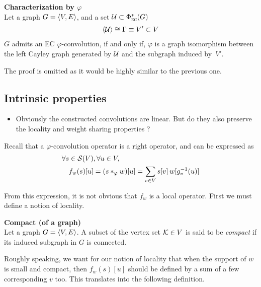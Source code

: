\begin{corrolary}\textbf{Characterization by $\varphi$}\\
Let a graph $\gve$, and a set $\cu \subset \Phi^*_{\EC}(G)$ \st
\begin{gather*}
\langle \cu \rangle \cong \Gamma \equiv V' \subset V
\end{gather*}
$G$ admits an EC $\varphi$-convolution, if and only if, $\varphi$ is a graph isomorphism between the left Cayley graph generated by $\cu$ and the subgraph induced by~$V'$.
\label{cor:cayley}
\end{corrolary}
The proof is omitted as it would be highly similar to the previous one.

\subsection{Intrinsic properties}

\begin{itemize}
  \item Obviously the constructed convolutions are linear. But do they also preserve the locality and weight sharing properties ?
\end{itemize}

Recall that a $\varphi$-convolution operator is a right operator, and can be expressed as
\begin{align}
\forall s \in \cs(V) &, \forall u \in V,\nonumber\\
f_w(s)[u] & = (s \ast_{\varphi} w) [u]\nonumber
            = \displaystyle\sum_{v \in V} s[v] \h{2} w[g_v^{-1}(u)] \label{eq:sum}
\end{align}

From this expression, it is not obvious that $f_w$ is a local operator. First we must define a notion of locality.

\begin{definition}\textbf{Compact (of a graph)}\\
Let a graph $\gve$. A subset of the vertex set $\ck \in V$ is said to be \emph{compact} if its induced subgraph in $G$ is connected.
\end{definition}

Roughly speaking, we want for our notion of locality that when the support of $w$ is small and compact, then $f_w(s)[u]$ should be defined by a sum of a few corresponding $v$ too. This translates into the following definition.

